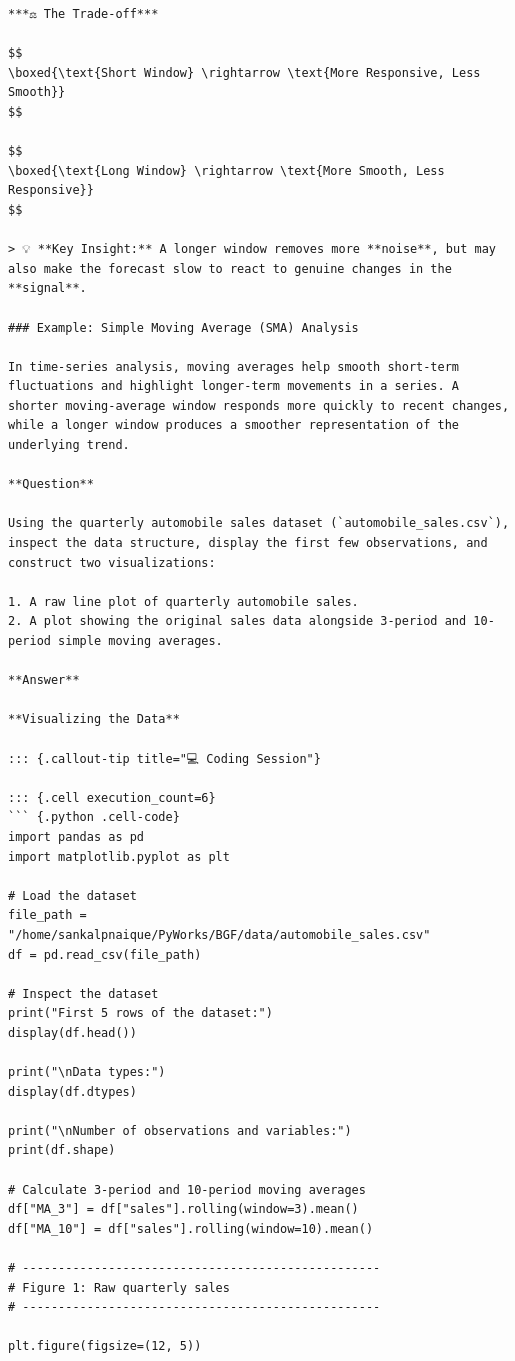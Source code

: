 \documentclass[
  a4paper,
]{article}
\begin{document}
\begin{verbatim}
***⚖️ The Trade-off***

$$
\boxed{\text{Short Window} \rightarrow \text{More Responsive, Less Smooth}}
$$

$$
\boxed{\text{Long Window} \rightarrow \text{More Smooth, Less Responsive}}
$$

> 💡 **Key Insight:** A longer window removes more **noise**, but may also make the forecast slow to react to genuine changes in the **signal**.

### Example: Simple Moving Average (SMA) Analysis

In time-series analysis, moving averages help smooth short-term fluctuations and highlight longer-term movements in a series. A shorter moving-average window responds more quickly to recent changes, while a longer window produces a smoother representation of the underlying trend.

**Question**

Using the quarterly automobile sales dataset (`automobile_sales.csv`), inspect the data structure, display the first few observations, and construct two visualizations:

1. A raw line plot of quarterly automobile sales.
2. A plot showing the original sales data alongside 3-period and 10-period simple moving averages.

**Answer**

**Visualizing the Data**

::: {.callout-tip title="💻 Coding Session"}

::: {.cell execution_count=6}
``` {.python .cell-code}
import pandas as pd
import matplotlib.pyplot as plt

# Load the dataset
file_path = "/home/sankalpnaique/PyWorks/BGF/data/automobile_sales.csv"
df = pd.read_csv(file_path)

# Inspect the dataset
print("First 5 rows of the dataset:")
display(df.head())

print("\nData types:")
display(df.dtypes)

print("\nNumber of observations and variables:")
print(df.shape)

# Calculate 3-period and 10-period moving averages
df["MA_3"] = df["sales"].rolling(window=3).mean()
df["MA_10"] = df["sales"].rolling(window=10).mean()

# --------------------------------------------------
# Figure 1: Raw quarterly sales
# --------------------------------------------------

plt.figure(figsize=(12, 5))


\end{verbatim}
\end{document}

